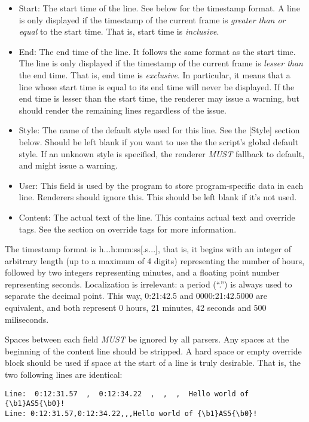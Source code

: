 \documentclass{spec}
\begin{document}
\begin{itemize}
\item Start: The start time of the line. See below for the timestamp format. A line is only displayed if
the timestamp of the current frame is \emph{greater than or equal} to the start time. That is, start
time is \emph{inclusive}.
\item End: The end time of the line. It follows the same format as the start time. The line is only
displayed if the timestamp of the current frame is \emph{lesser than} the end time. That is, end time is
\emph{exclusive}. In particular, it means that a line whose start time is equal to its end time will
never be displayed. If the end time is lesser than the start time, the renderer may issue a warning,
but should render the remaining lines regardless of the issue.
\item Style: The name of the default style used for this line. See the [Style] section below. Should be
left blank if you want to use the the script's global default style. If an unknown style is specified,
the renderer \emph{MUST} fallback to default, and might issue a warning.
\item User: This field is used by the program to store program-specific data in each line. Renderers
should ignore this. This should be left blank if it's not used.
\item Content: The actual text of the line. This contains actual text and override tags. See the section
on override tags for more information.
\end{itemize}

The timestamp format is h...h:mm:ss[.s...], that is, it begins with an integer of arbitrary length
(up to a maximum of 4 digits) representing the number of hours, followed by two integers representing
minutes, and a floating point number representing seconds. Localization is irrelevant: a period ("`."')
is always used to separate the decimal point. This way, 0:21:42.5 and 0000:21:42.5000 are equivalent,
and both represent 0 hours, 21 minutes, 42 seconds and 500 miliseconds.

Spaces between each field \emph{MUST} be ignored by all parsers. Any spaces at the beginning of the
content line should be stripped. A hard space or empty override block should be used if space at the
start of a line is truly desirable. That is, the two following lines are identical:

\begin{verbatim}
Line:  0:12:31.57  ,  0:12:34.22  ,  ,  ,  Hello world of {\b1}AS5{\b0}!
Line: 0:12:31.57,0:12:34.22,,,Hello world of {\b1}AS5{\b0}!
\end{verbatim}
\end{document}
